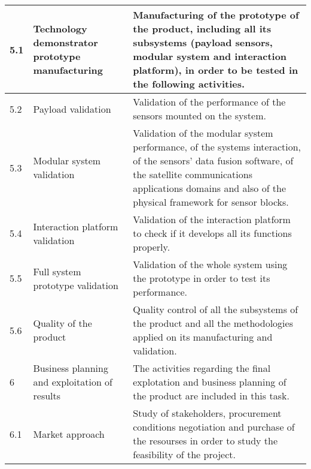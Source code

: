 \begin{longtable}[H]{p{1.5cm} >{\raggedright\arraybackslash}p{4cm} p{8cm}}
	\midrule
	
	5.1 & Technology demonstrator prototype manufacturing & Manufacturing of the prototype of the product, including all its subsystems (payload sensors, modular system and interaction platform), in order to be tested in the following activities.\vspace{0.2cm} \\
	
	\midrule
	
	5.2 & Payload validation & Validation of the performance of the sensors mounted on the system.\vspace{0.2cm} \\
	
	\midrule
	
	5.3 & Modular system validation & Validation of the modular system performance, of the systems interaction, of the sensors' data fusion software, of the satellite communications applications domains and also of the physical framework for sensor blocks.\vspace{0.2cm} \\
	
	\midrule
	
	5.4 & Interaction platform validation & Validation of the interaction platform to check if it develops all its functions properly.\vspace{0.2cm} \\
	
	\midrule
	
	5.5 & Full system prototype validation & Validation of the whole system using the prototype in order to test its performance.\vspace{0.2cm} \\
	
	\midrule
	
	5.6 & Quality of the product & Quality control of all the subsystems of the product and all the methodologies applied on its manufacturing and validation.\vspace{0.2cm} \\
	
	\midrule
	
	6 & Business planning and exploitation of results & The activities regarding the final explotation and business planning of the product are included in this task.\vspace{0.2cm} \\
	
	\midrule
	
	6.1 & Market approach & Study of stakeholders, procurement conditions negotiation and purchase of the resourses in order to study the feasibility of the project.\vspace{0.2cm} \\
	

\end{longtable}
